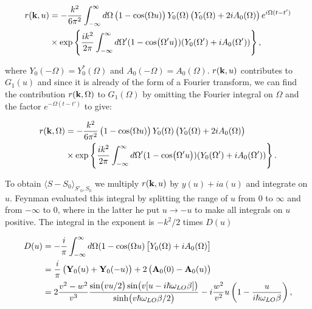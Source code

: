 \begin{equation}
    \begin{aligned}
        r(\vb{k}, u) &=  -\frac{k^2}{6\pi^2} \int^{\infty}_{-\infty} d\Omega \left(1 - \cos(\Omega u) \right) Y_0(\Omega) \left( Y_0(\Omega) + 2i A_0(\Omega) \right) e^{i\Omega (t - t')} \\
        &\times \exp\left\{ \frac{ik^2}{2\pi} \int^\infty_{-\infty} d\Omega' (1 - \cos(\Omega' u)) (Y_0(\Omega') + i A_0(\Omega')) \right\},
    \end{aligned}
\end{equation}

where $Y_0(-\Omega) = Y^*_0(\Omega)$ and $A_0(-\Omega) = A_0(\Omega)$. $r(\vb{k}, u)$ contributes to $G_1(u)$ and since it is already of the form of a Fourier transform, we can find the contribution $r(\vb{k}, \Omega)$ to $G_1(\Omega)$ by omitting the Fourier integral on $\Omega$ and the factor $e^{-\Omega(t - t')}$ to give:

\begin{equation}
    \begin{aligned}
        r(\vb{k}, \Omega) &= -\frac{k^2}{6\pi^2} \left(1 - \cos(\Omega u) \right) Y_0(\Omega) \left( Y_0(\Omega) + 2i A_0(\Omega) \right) \\
        &\times \exp\left\{ \frac{ik^2}{2\pi} \int^\infty_{-\infty} d\Omega' (1 - \cos(\Omega' u)) (Y_0(\Omega') + i A_0(\Omega')) \right\}.
    \end{aligned}
\end{equation}

To obtain $\langle S - S_0 \rangle_{S'_0, S_0}$ we multiply $r(\vb{k}, u)$ by $y(u) + ia(u)$ and integrate on $u$. Feynman evaluated this integral by splitting the range of $u$ from $0$ to $\infty$ and from $-\infty$ to $0$, where in the latter he put $u \to -u$ to make all integrals on $u$ positive. The integral in the exponent is $-k^2 / 2$ times $D(u)$

\begin{equation}\label{eqn:D_FHIP}
    \begin{aligned}
        D(u) &= -\frac{i}{\pi} \int^\infty_{-\infty} d\Omega (1 - \cos(\Omega u) \left[ Y_0(\Omega) + iA_0(\Omega) \right] \\
        &= \frac{i}{\pi} \left( \vb{Y}_0(u) + \vb{Y}_0(-u) \right) + 2 \left( \vb{A}_0(0) - \vb{A}_0(u) \right) \\
        &= 2 \frac{v^2-w^2}{v^3} \frac{\sin(vu/2) \sin(v[u-i\hslash\omega_{LO}\beta])}{\sinh(v\hslash\omega_{LO}\beta/2)}-i\frac{w^2}{v^2}u\left(1-\frac{u}{i\hslash\omega_{LO}\beta}\right),
    \end{aligned}
\end{equation}

